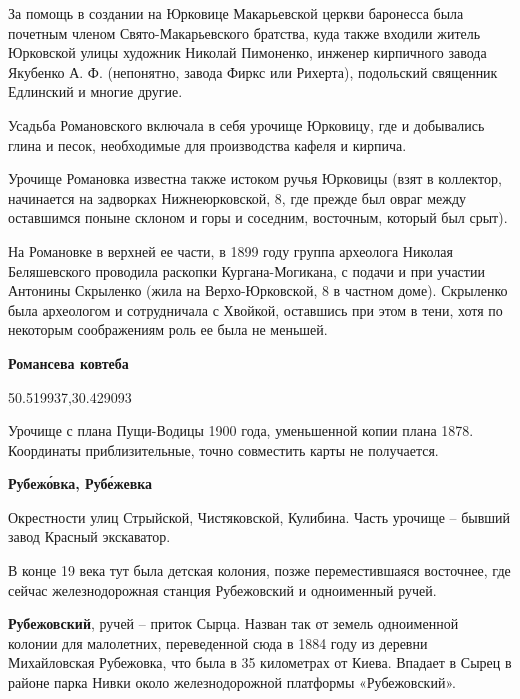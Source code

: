 За помощь в создании на Юрковице Макарьевской церкви баронесса была почетным членом Свято-Макарьевского братства, куда также входили житель Юрковской улицы художник Николай Пимоненко, инженер кирпичного завода Якубенко А. Ф. (непонятно, завода Фиркс или Рихерта), подольский священник Едлинский и многие другие.

Усадьба Романовского включала в себя урочище Юрковицу, где и добывались глина и песок, необходимые для производства кафеля и кирпича.

Урочище Романовка известна также истоком ручья Юрковицы (взят в коллектор, начинается на задворках Нижнеюрковской, 8, где прежде был овраг между оставшимся поныне склоном и горы и соседним, восточным, который был срыт).

На Романовке в верхней ее части, в 1899 году группа археолога Николая Беляшевского проводила раскопки Кургана-Могикана, с подачи и при участии Антонины Скрыленко (жила на Верхо-Юрковской, 8 в частном доме). Скрыленко была археологом и сотрудничала с Хвойкой, оставшись при этом в тени, хотя по некоторым соображениям роль ее была не меньшей.\\

\medskip

\textbf{Романсева ковтеба}

50.519937,30.429093

Урочище с плана Пущи-Водицы 1900 года, уменьшенной копии плана 1878. Координаты приблизительные, точно совместить карты не получается.\\ 

\medskip

  
\textbf{Рубеж\'овка, Руб\'ежевка} 

Окрестности улиц Стрыйской, Чистяковской, Кулибина. Часть урочище – бывший завод Красный экскаватор.

В конце 19 века тут была детская колония, позже переместившаяся восточнее, где сейчас железнодорожная станция Рубежовский и одноименный ручей.\\

\medskip

\textbf{Рубежовский}, ручей – приток Сырца. Назван так от земель одноименной колонии для малолетних, переведенной сюда в 1884 году из деревни Михайловская Рубежовка, что была в 35 километрах от Киева. Впадает в Сырец в районе парка Нивки около железнодорожной платформы «Рубежовский».\\

\medskip


